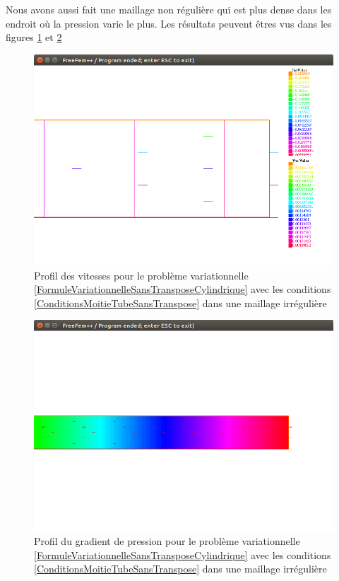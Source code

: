 \documentclass[11pt,a4paper]{article}
\numberwithin{equation}{subsection}
\numberwithin{figure}{subsection}
\begin{document}
Nous avons aussi fait une maillage non régulière qui est plus dense dans les endroit où la pression varie le plus. Les résultats peuvent êtres vus dans les figures \ref{StokesClassiqueVitessesCylindriqueIrregulier} et \ref{StokesClassiquePressionCylindriqueIrregulier}

\begin{figure}
\centering
\includegraphics[scale=0.4]{StokesClassiqueVitessesCylindriqueIrregulier.png}
\caption{Profil des vitesses pour le problème variationnelle \ref{FormuleVariationnelleSansTransposeCylindrique} avec les conditions \ref{ConditionsMoitieTubeSansTranspose} dans une maillage irrégulière}
\label{StokesClassiqueVitessesCylindriqueIrregulier}
\end{figure}

\begin{figure}
\centering
\includegraphics[scale=0.4]{StokesClassiquePressionCylindriqueIrregulier.png}
\caption{Profil du gradient de pression pour le problème variationnelle \ref{FormuleVariationnelleSansTransposeCylindrique} avec les conditions \ref{ConditionsMoitieTubeSansTranspose} dans une maillage irrégulière}
\label{StokesClassiquePressionCylindriqueIrregulier}
\end{figure}
\end{document}

